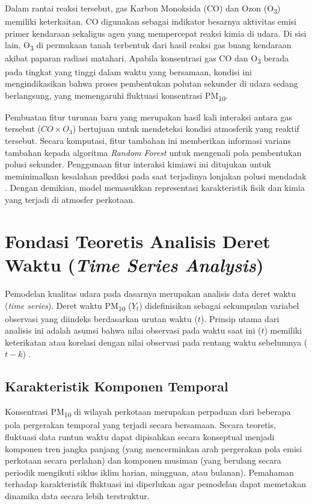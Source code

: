 Dalam rantai reaksi tersebut, gas Karbon Monoksida (CO) dan Ozon (O\textsubscript{3}) memiliki keterkaitan. CO digunakan sebagai indikator besarnya aktivitas emisi primer kendaraan sekaligus agen yang mempercepat reaksi kimia di udara. Di sisi lain, O\textsubscript{3} di permukaan tanah terbentuk dari hasil reaksi gas buang kendaraan akibat paparan radiasi matahari. Apabila konsentrasi gas CO dan O\textsubscript{3} berada pada tingkat yang tinggi dalam waktu yang bersamaan, kondisi ini mengindikasikan bahwa proses pembentukan polutan sekunder di udara sedang berlangsung, yang memengaruhi fluktuasi konsentrasi PM\textsubscript{10}.

Pembuatan fitur turunan baru yang merupakan hasil kali interaksi antara gas tersebut ($CO \times O_3$) bertujuan untuk mendeteksi kondisi atmosferik yang reaktif tersebut. Secara komputasi, fitur tambahan ini memberikan informasi varians tambahan kepada algoritma \textit{Random Forest} untuk mengenali pola pembentukan polusi sekunder. Penggunaan fitur interaksi kimiawi ini ditujukan untuk meminimalkan kesalahan prediksi pada saat terjadinya lonjakan polusi mendadak \autocite{naz2024two}. Dengan demikian, model memasukkan representasi karakteristik fisik dan kimia yang terjadi di atmosfer perkotaan.

\section{Fondasi Teoretis Analisis Deret Waktu (\textit{Time Series Analysis})}

Pemodelan kualitas udara pada dasarnya merupakan analisis data deret waktu (\textit{time series}). Deret waktu PM\textsubscript{10} ($Y_t$) didefinisikan sebagai sekumpulan variabel observasi yang diindeks berdasarkan urutan waktu ($t$). Prinsip utama dari analisis ini adalah asumsi bahwa nilai observasi pada waktu saat ini ($t$) memiliki keterikatan atau korelasi dengan nilai observasi pada rentang waktu sebelumnya ($t-k$) \autocite{vasconcelos2025stationarity}.

\subsection{Karakteristik Komponen Temporal}

Konsentrasi PM\textsubscript{10} di wilayah perkotaan merupakan perpaduan dari beberapa pola pergerakan temporal yang terjadi secara bersamaan. Secara teoretis, fluktuasi data runtun waktu dapat dipisahkan secara konseptual menjadi komponen tren jangka panjang (yang mencerminkan arah pergerakan pola emisi perkotaan secara perlahan) dan komponen musiman (yang berulang secara periodik mengikuti siklus iklim harian, mingguan, atau bulanan). Pemahaman terhadap karakteristik fluktuasi ini diperlukan agar pemodelan dapat memetakan dinamika data secara lebih terstruktur.

